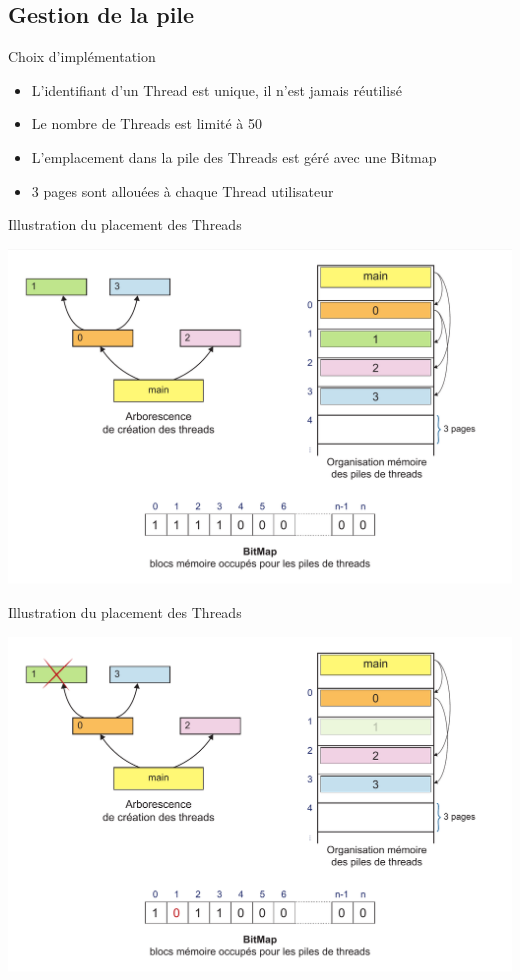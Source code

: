 \documentclass{beamer}
\begin{document}
\subsection{Gestion de la pile}
\begin{frame}
	\begin{block}{Choix d’implémentation }
		\begin{itemize}
			\item L'identifiant d'un Thread est unique, il n'est jamais réutilisé
			\item Le nombre de Threads est limité à 50 
			\item L'emplacement dans la pile des Threads est géré avec une Bitmap
			\item 3 pages sont allouées à chaque Thread utilisateur 
		\end{itemize}
	\end{block}
\end{frame}

\begin{frame}{Illustration du placement des Threads}
  	\begin{center}
	  	\includegraphics[scale=0.23]{images/FS3.png}
  	\end{center}
\end{frame}

\begin{frame}{Illustration du placement des Threads}
  	\begin{center}
	  	\includegraphics[scale=0.23]{images/FS4.png}
  	\end{center}
\end{frame}
\end{document}
